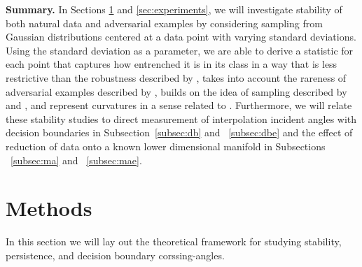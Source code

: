 
{\bf Summary.}
 In Sections \ref{sec:meth} and \ref{sec:experiments}, we will investigate stability of both natural data and adversarial examples by considering sampling from Gaussian distributions centered at a data point with varying standard deviations. Using the standard deviation as a parameter, we are able to derive a statistic for each point that captures how entrenched it is in its class in a way that is less restrictive than the robustness described by \citet{Khoury2018}, takes into account the rareness of adversarial examples described by \citet{yu2019new}, builds on the idea of sampling described by \citet{roth19aodds} and \citet{hosseini2019odds}, and represent curvatures in a sense related to \citet{Fawzi2018empirical}. Furthermore, we will relate these stability studies to direct measurement of interpolation incident angles with decision boundaries in Subsection~\ref{subsec:db} and ~\ref{subsec:dbe} and the effect of reduction of data onto a known lower dimensional manifold in Subsections ~\ref{subsec:ma} and ~\ref{subsec:mae}.  


\section{Methods} \label{sec:meth} %

In this section we will lay out the theoretical framework for studying stability, persistence, and decision boundary corssing-angles. 

